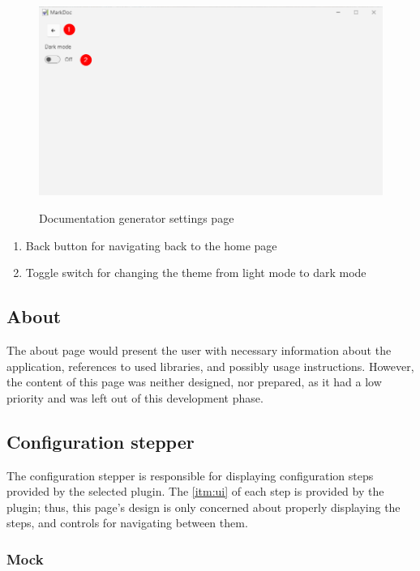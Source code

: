 \begin{figure}[H]
    \includegraphics[width=\linewidth]{img/markDocSettings.png}
    \label{fig:settingsPage}
    \caption{Documentation generator settings page}
\end{figure}

\begin{enumerate}
    \item Back button for navigating back to the home page
    \item Toggle switch for changing the theme from light mode to dark mode
\end{enumerate}

\subsection{About}

The about page would present the user with necessary information about the application, references to used libraries, and possibly usage instructions. However, the content of this page was neither designed, nor prepared, as it had a low priority and was left out of this development phase.

\subsection{Configuration stepper}

The configuration stepper is responsible for displaying configuration steps provided by the selected plugin. The \ref{itm:ui} of each step is provided by the plugin; thus, this page's design is only concerned about properly displaying the steps, and controls for navigating between them.

\subsubsection{Mock}

